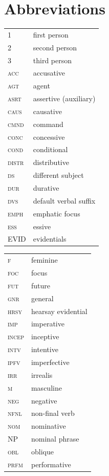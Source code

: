 \documentclass[output=paper,modfonts,nonflat,colorlinks,citecolor=brown]{langscibook}
\begin{document}
\section*{Abbreviations}
\begin{tabularx}{.45\textwidth}{lQ}
1 & first person\\
2 & second person\\
3 &  third person\\
\scshape acc & accusative\\ 
\scshape agt &  agent\\
\scshape asrt  & assertive (auxiliary)\\  
\scshape caus & causative\\ 
\scshape cmnd  & command\\  
\scshape conc  & concessive\\
\scshape cond  & conditional\\
\scshape distr & distributive\\
\scshape ds  & different subject\\
\scshape dur & durative\\
\scshape dvs & default verbal suffix\\
\scshape emph  & emphatic focus\\
\scshape ess & essive\\
\scshape EVID & evidentials\\%
\end{tabularx}
\begin{tabularx}{.45\textwidth}{lQ}
\scshape f & feminine\\
\scshape foc & focus\\
\scshape fut & future\\
\scshape gnr & general \\
\scshape hrsy & hearsay evidential\\
\scshape imp & imperative\\
\scshape incep & inceptive\\
\scshape intv & intentive\\
\scshape ipfv & imperfective\\
\scshape irr & irrealis\\
\scshape m & masculine\\
\scshape neg & negative\\
\scshape nfnl & non-final verb\\
\scshape nom & nominative\\
\scshape NP & nominal phrase\\
\scshape obl & oblique\\
\scshape prfm & performative\\
\end{tabularx}
\end{document}
